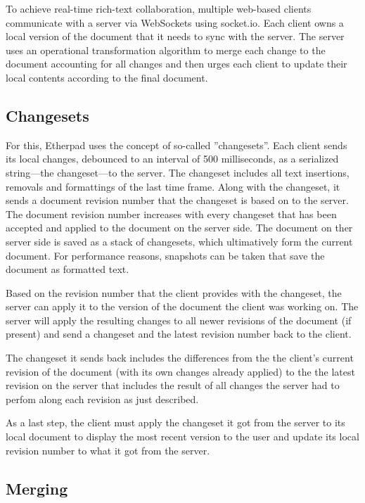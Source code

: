 To achieve real-time rich-text collaboration, multiple web-based clients communicate with a server via WebSockets using socket.io. Each client owns a local version of the document that it needs to sync with the server. The server uses an operational transformation algorithm to merge each change to the document accounting for all changes and then urges each client to update their local contents according to the final document.

\subsection{Changesets}

For this, Etherpad uses the concept of so-called ''changesets''. Each client sends its local changes, debounced to an interval of 500 milliseconds, as a serialized string---the changeset---to the server. The changeset includes all text insertions, removals and formattings of the last time frame. Along with the changeset, it sends a document revision number that the changeset is based on to the server. The document revision number increases with every changeset that has been accepted and applied to the document on the server side. The document on ther server side is saved as a stack of changesets, which ultimatively form the current document. For performance reasons, snapshots can be taken that save the document as formatted text. 

Based on the revision number that the client provides with the changeset, the server can apply it to the version of the document the client was working on. The server will apply the resulting changes to all newer revisions of the document (if present) and send a changeset and the latest revision number back to the client.

The changeset it sends back includes the differences from the the client's current revision of the document (with its own changes already applied) to the the latest revision on the server that includes the result of all changes the server had to perfom along each revision as just described.

As a last step, the client must apply the changeset it got from the server to its local document to display the most recent version to the user and update its local revision number to what it got from the server.

\subsection{Merging}


